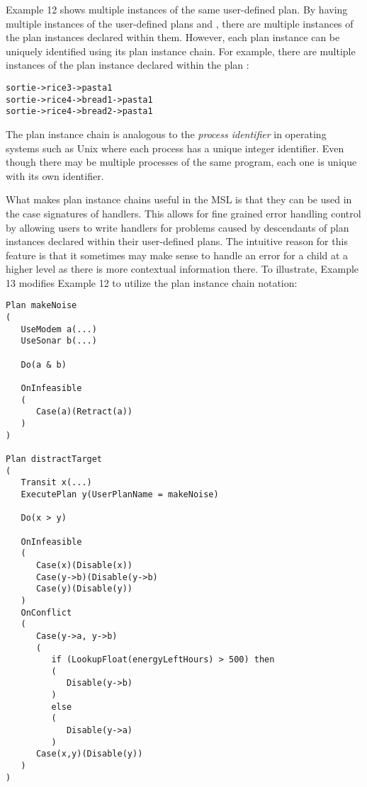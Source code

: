 Example 12 shows multiple instances of the same user-defined plan. By having multiple instances of the user-defined plans  and , there are multiple instances of the plan instances declared within them. However, each plan instance can be uniquely identified using its plan instance chain. For example, there are multiple instances of the plan instance  declared within the plan :

\begin{verbatim}
sortie->rice3->pasta1
sortie->rice4->bread1->pasta1
sortie->rice4->bread2->pasta1
\end{verbatim} 

The plan instance chain is analogous to the \emph{process identifier} in operating systems such as Unix where each process has a unique integer identifier. Even though there may be multiple processes of the same program, each one is unique with its own identifier.

What makes plan instance chains useful in the MSL is that they can be used in the case signatures of handlers. This allows for fine grained error handling control by allowing users to write handlers for problems caused by descendants of plan instances declared within their user-defined plans. The intuitive reason for this feature is that it sometimes may make sense to handle an error for a child at a higher level as there is more contextual information there. To illustrate, Example 13 modifies Example 12 to utilize the plan instance chain notation:

\begin{verbatim}
Plan makeNoise
(
   UseModem a(...)
   UseSonar b(...)   
   
   Do(a & b)
   
   OnInfeasible
   (
      Case(a)(Retract(a))
   )
)

Plan distractTarget
(
   Transit x(...)
   ExecutePlan y(UserPlanName = makeNoise)
   
   Do(x > y)

   OnInfeasible
   (
      Case(x)(Disable(x))
      Case(y->b)(Disable(y->b)
      Case(y)(Disable(y))		
   )
   OnConflict
   (
      Case(y->a, y->b) 
      (
         if (LookupFloat(energyLeftHours) > 500) then 
         (
            Disable(y->b)
         )
         else
         (
            Disable(y->a)
         )
      Case(x,y)(Disable(y))
   )   
)
\end{verbatim}
\\


